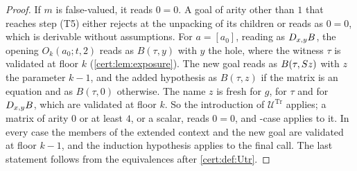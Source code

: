 \begin{proof}
If $m$ is false-valued, it reads $0=0$. A goal of arity other than $1$ that
reaches step (T5) either rejects at the unpacking of its children or reads as
$0=0$, which is derivable without assumptions. For $a=[a_0]$, reading as
$D_{x,y}B$, the opening $O_k(a_0;t,2)$ reads as $B(\tau,y)$ with $y$ the
hole, where the witness $\tau$ is validated at floor $k$
(\cref{cert:lem:exposure}). The new goal reads as $B(\tau,S z)$ with $z$
the parameter $k-1$, and the added hypothesis as $B(\tau,z)$ if the matrix is
an equation and as $B(\tau,0)$ otherwise. The name $z$ is fresh for $g$, for
$\tau$ and for $D_{x,y}B$, which are validated at floor $k$. So the
introduction of $\mathcal U^{\mathrm{Tr}}$ applies; a matrix of arity $0$ or
at least $4$, or a scalar, reads $0=0$, and -case applies to it.
In every case the members of the extended context and the new goal are
validated at floor $k-1$, and the induction hypothesis applies to the final
call. The last statement follows from the equivalences after
\cref{cert:def:Utr}.
\end{proof}

